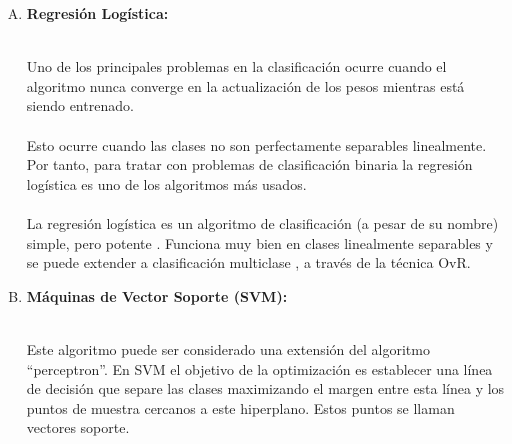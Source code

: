 \documentclass[11pt,a4paper]{article}
\begin{document}
	        \begin{enumerate}[A.]
		
			\item \textbf{Regresión Logística:}
			
			\\Uno de los principales problemas en la clasificación ocurre cuando el algoritmo nunca converge en la actualización de los pesos mientras está siendo entrenado.\\
            
            \\Esto ocurre cuando las clases no son perfectamente separables linealmente. Por tanto, para tratar con problemas de clasificación binaria la regresión logística es uno de los algoritmos más usados.\\
            
            \\La regresión logística es un algoritmo de clasificación (a pesar de su nombre) simple, pero potente . Funciona muy bien en clases linealmente separables y se puede extender a clasificación multiclase , a través de la técnica OvR.\\
			
			\item \textbf{Máquinas de Vector Soporte (SVM):}
			
			\\Este algoritmo puede ser considerado una extensión del algoritmo “perceptron”. En SVM el objetivo de la optimización es establecer una línea de decisión que separe las clases maximizando el margen entre esta línea y los puntos de muestra cercanos a este hiperplano. Estos puntos se llaman vectores soporte.\\
			

\end{enumerate}
\end{document}
